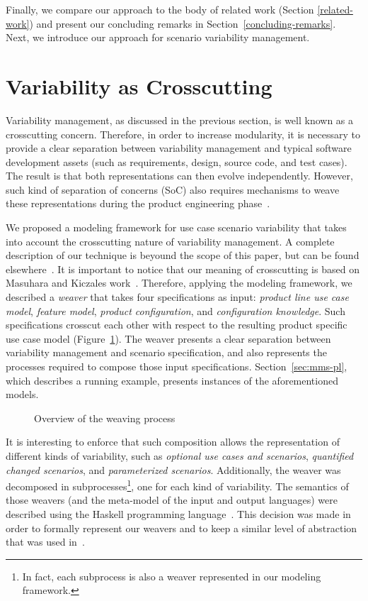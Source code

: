 \documentclass{acm_proc_article-sp}
\begin{document}
Finally, we compare our approach to the body of related work (Section \ref{related-work}) and present our concluding remarks in 
Section~\ref{concluding-remarks}. Next, we introduce our approach for scenario variability management.
   
\section{Variability as Crosscutting}
\label{scenario-variability}

Variability management, as discussed in the previous section, is well known as a crosscutting concern. Therefore, in order to increase modularity, it is necessary to provide a clear separation between 
variability management and typical software development assets (such as requirements, design, source code, and test cases). The result is that both representations can then evolve independently. However, such kind of separation of concerns (SoC) also requires mechanisms to weave these representations during the product engineering phase~\cite{northrop-spl-book}.

We proposed a modeling framework for use case scenario variability that takes into account the crosscutting nature of variability management. A complete description of our technique is beyound the scope of this paper, but can be found elsewhere~\cite{}. It is important to notice that our meaning of crosscutting is based on Masuhara and Kiczales work~\cite{masuhara-ecoop-2003}. Therefore, applying the modeling framework, we described a \emph{weaver} that takes four specifications as input: \emph{product line use case model}, \emph{feature model}, \emph{product configuration}, and \emph{configuration knowledge}. Such specifications crosscut each other with respect to the resulting product specific use case model (Figure~\ref{fig:wp}). The weaver presents a clear separation between variability management and scenario specification, and also represents the processes required to compose those input specifications. Section~\ref{sec:mms-pl}, which describes a running example, presents instances of the aforementioned models.

\begin{figure}[h]
\centering
{}
\caption{Overview of the weaving process}
\label{fig:wp}
\end{figure}

It is interesting to enforce that such composition allows the representation of different kinds of variability, such as \emph{optional use cases and scenarios}, \emph{quantified changed scenarios}, and 
\emph{parameterized scenarios}. Additionally, the weaver was decomposed in subprocesses\footnote{In fact, each subprocess is also a weaver represented in our modeling framework.}, one for each kind of variability. The semantics of those weavers (and the meta-model of the input and output languages) were described using the Haskell programming language~\cite{haskell-report}. This decision was made in order to formally represent our weavers and to keep a similar level of abstraction that was used in~\cite{masuhara-ecoop-2003}.
\end{document}
